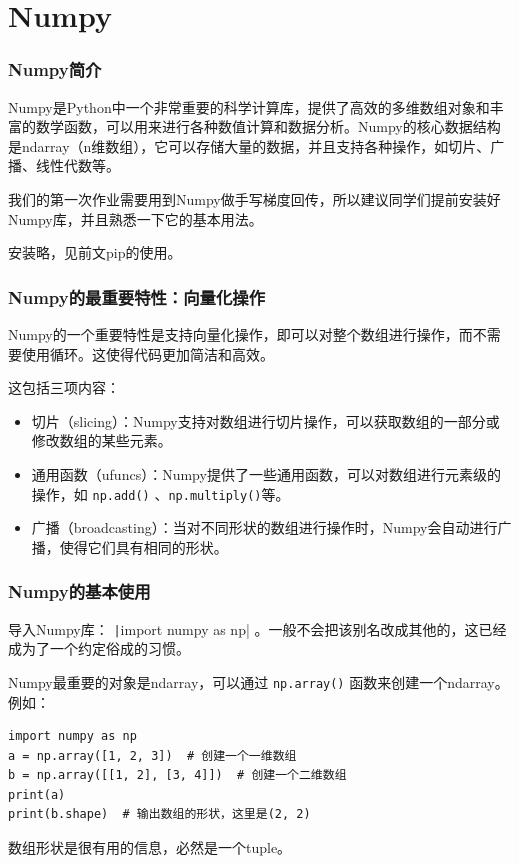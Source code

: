 \section{Numpy}

\begin{frame}
    \frametitle{Numpy简介}

    Numpy是Python中一个非常重要的科学计算库，提供了高效的多维数组对象和丰富的数学函数，可以用来进行各种数值计算和数据分析。Numpy的核心数据结构是ndarray（n维数组），它可以存储大量的数据，并且支持各种操作，如切片、广播、线性代数等。

    我们的第一次作业需要用到Numpy做手写梯度回传，所以建议同学们提前安装好Numpy库，并且熟悉一下它的基本用法。

    安装略，见前文pip的使用。

\end{frame}

\begin{frame}[fragile]
    \frametitle{Numpy的最重要特性：向量化操作}

    Numpy的一个重要特性是支持向量化操作，即可以对整个数组进行操作，而不需要使用循环。这使得代码更加简洁和高效。

    这包括三项内容：
    \begin{itemize}
        \item 切片（slicing）：Numpy支持对数组进行切片操作，可以获取数组的一部分或修改数组的某些元素。
            \item 通用函数（ufuncs）：Numpy提供了一些通用函数，可以对数组进行元素级的操作，如 \texttt{np.add()} 、\texttt{np.multiply()}等。
        \item 广播（broadcasting）：当对不同形状的数组进行操作时，Numpy会自动进行广播，使得它们具有相同的形状。
    \end{itemize}

\end{frame}

\begin{frame}[fragile]
    \frametitle{Numpy的基本使用}

    导入Numpy库： \texttt|import numpy as np| 。一般不会把该别名改成其他的，这已经成为了一个约定俗成的习惯。

    Numpy最重要的对象是ndarray，可以通过 \texttt{np.array()} 函数来创建一个ndarray。例如：
    \begin{verbatim}
import numpy as np
a = np.array([1, 2, 3])  # 创建一个一维数组
b = np.array([[1, 2], [3, 4]])  # 创建一个二维数组
print(a)
print(b.shape)  # 输出数组的形状，这里是(2, 2)
    \end{verbatim}
    数组形状是很有用的信息，必然是一个tuple。

\end{frame}

